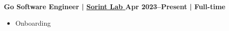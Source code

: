 \textbf{Go Software Engineer | 
\href{https://www.sorint.com/en/}{
    {Sorint Lab} 
} \hfill Apr 2023--Present | Full-time}

\par
\begin{itemize}[label=$\bullet$]
    \item Onboarding 
    \newline
\end{itemize}
\par
